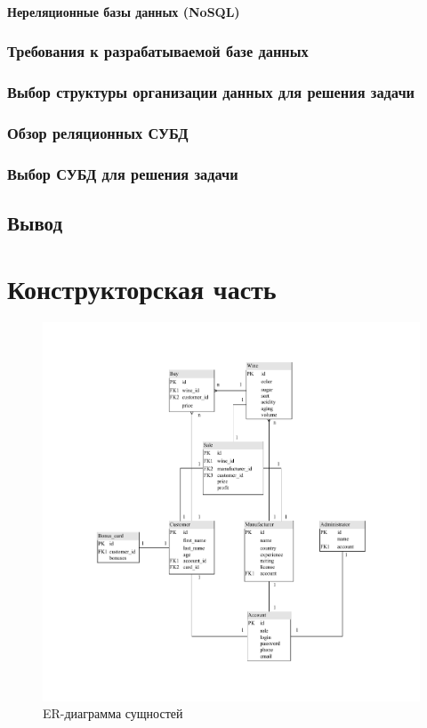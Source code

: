\subsubsection{Нереляционные базы данных (NoSQL)}

\subsection{Требования к разрабатываемой базе данных}

\subsection{Выбор структуры организации данных для решения задачи}

\subsection{Обзор реляционных СУБД}

\subsection{Выбор СУБД для решения задачи}

\section{Вывод}

\chapter{Конструкторская часть}

\begin{figure}[H]
	\begin{center}
		\includegraphics[scale=0.75]{img/ER-diagram.pdf}
	\end{center}
	\captionsetup{justification=centering}
	\caption{ER-диаграмма сущностей}
	\label{img:er}
\end{figure}

